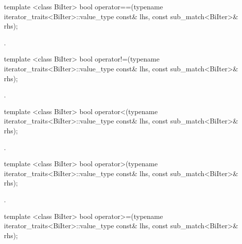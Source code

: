\documentclass[ebook,11pt,article]{memoir}
\begin{document}
\begin{itemdecl}
template <class BiIter> 
  bool operator==(typename iterator_traits<BiIter>::value_type const& lhs, 
                  const sub_match<BiIter>& rhs);
\end{itemdecl}

\begin{itemdescr}
\pnum
\returns {}.
\end{itemdescr}

\begin{itemdecl}
template <class BiIter> 
  bool operator!=(typename iterator_traits<BiIter>::value_type const& lhs, 
                  const sub_match<BiIter>& rhs); 
\end{itemdecl}

\begin{itemdescr}
\pnum
\returns {}.
\end{itemdescr}

\begin{itemdecl}
template <class BiIter> 
  bool operator<(typename iterator_traits<BiIter>::value_type const& lhs, 
                 const sub_match<BiIter>& rhs); 
\end{itemdecl}

\begin{itemdescr}
\pnum
\returns {}.
\end{itemdescr}

\begin{itemdecl}
template <class BiIter> 
  bool operator>(typename iterator_traits<BiIter>::value_type const& lhs, 
                 const sub_match<BiIter>& rhs); 
\end{itemdecl}

\begin{itemdescr}
\pnum
\returns {}.
\end{itemdescr}

\begin{itemdecl}
template <class BiIter> 
  bool operator>=(typename iterator_traits<BiIter>::value_type const& lhs, 
                  const sub_match<BiIter>& rhs); 
\end{itemdecl}
\end{document}

